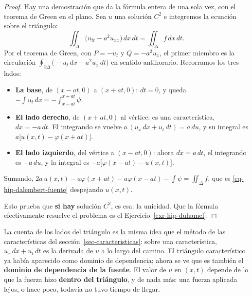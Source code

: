 \documentclass[
  spanish,
  a4paper,
]{scrbook}
\providecommand{\tightlist}{%
  \setlength{\itemsep}{0pt}\setlength{\parskip}{0pt}}
\theoremstyle{definition}
\theoremstyle{plain}
\theoremstyle{definition}
\theoremstyle{plain}
\theoremstyle{definition}
\theoremstyle{remark}
\begin{document}
\begin{proof}
Hay una demostración que da la fórmula entera de una sola vez, con el
teorema de Green en el plano. Sea \(u\) una solución \(C^2\) e
integremos la ecuación sobre el triángulo: \[
\iint_{\Delta}\big(u_{tt} - a^2u_{xx}\big)\,dx\,dt = \iint_\Delta f\,dx\,dt .
\] Por el teorema de Green, con \(P = -u_t\) y \(Q = -a^2u_x\), el
primer miembro es la circulación
\(\oint_{\partial\Delta}\big(-u_t\,dx - a^2u_x\,dt\big)\) en sentido
antihorario. Recorramos los tres lados:

\begin{itemize}
\tightlist
\item
  \textbf{La base}, de \((x-at,0)\) a \((x+at,0)\): \(dt = 0\), y queda
  \(-\int u_t\,dx = -\int_{x-at}^{x+at}\psi\).
\item
  \textbf{El lado derecho}, de \((x+at,0)\) al vértice: es una
  característica, \(dx = -a\,dt\). El integrando se vuelve
  \(a\,(u_x\,dx + u_t\,dt) = a\,du\), y su integral es
  \(a\big[u(x,t) - \varphi(x+at)\big]\).
\item
  \textbf{El lado izquierdo}, del vértice a \((x-at,0)\): ahora
  \(dx = a\,dt\), el integrando es \(-a\,du\), y la integral es
  \(-a\big[\varphi(x-at) - u(x,t)\big]\).
\end{itemize}

Sumando,
\(2a\,u(x,t) - a\varphi(x+at) - a\varphi(x-at) - \int\psi = \iint_\Delta f\),
que es \ref{eq-hip-dalembert-fuente} despejando \(u(x,t)\).

Esto prueba que \textbf{si hay} solución \(C^2\), es esa: la unicidad.
Que la fórmula efectivamente resuelve el problema es el
Ejercicio~\ref{exr-hip-duhamel}.
\end{proof}

La cuenta de los lados del triángulo es la misma idea que el método de
las características del sección~\ref{sec-caracteristicas}: sobre una
característica, \(u_x\,dx + u_t\,dt\) es la derivada de \(u\) a lo largo
del camino. El triángulo característico ya había aparecido como dominio
de dependencia; ahora se ve que es también el \textbf{dominio de
dependencia de la fuente}. El valor de \(u\) en \((x,t)\) depende de lo
que la fuerza hizo \textbf{dentro del triángulo}, y de nada más: una
fuerza aplicada lejos, o hace poco, todavía no tuvo tiempo de llegar.
\end{document}
